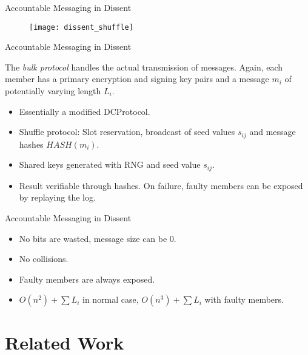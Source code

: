 \documentclass[]{beamer} %
\begin{document}
\begin{frame}{Accountable Messaging in Dissent}

\begin{figure}[h!]
\centering
\texttt{[image: dissent\_shuffle]}
\end{figure}

\end{frame}

\begin{frame}{Accountable Messaging in Dissent}

The \emph{bulk protocol} handles the actual transmission of messages. Again, each member has
a primary encryption and signing key pairs and a message $m_i$ of potentially varying length
$L_i$. 

\begin{itemize}
\item Essentially a modified \ac{DCProtocol}.
\item Shuffle protocol: Slot reservation, broadcast of seed values $s_{ij}$
      and message hashes $HASH(m_i)$.
\item Shared keys generated with RNG and seed value $s_{ij}$.
\item Result verifiable through hashes. On failure, faulty members can be exposed
      by replaying the log. %
\end{itemize}

\end{frame}

\begin{frame}{Accountable Messaging in Dissent}

\begin{itemize}
\item No bits are wasted, message size can be 0.
\item No collisions.
\item Faulty members are always exposed.
\item $O(n^2) + \sum L_i$ in normal case, $O(n^3) + \sum L_i$ with faulty members.
\end{itemize}

\end{frame}

\section{Related Work}
\end{document}
